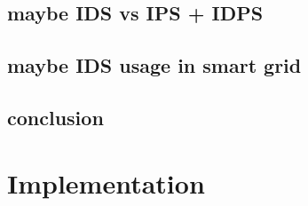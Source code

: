 \section{maybe IDS vs IPS + IDPS}

\section{maybe IDS usage in smart grid}


\section{conclusion}













\chapter{Implementation} \label{chap:Implementation}
